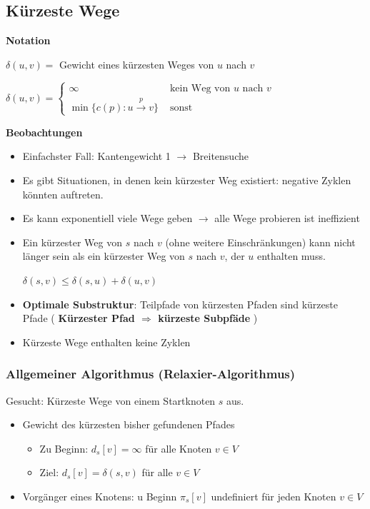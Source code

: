 \newpage

\begin{sectionbox}
\subsection{Kürzeste Wege}\smallskip
\textbf{Notation}\par\smallskip
$\delta(u, v)=$ Gewicht eines kürzesten Weges von $u$ nach $v$\par
$\delta(u, v)=\left\{\begin{array}{ll}
\infty & \text { kein Weg von } u \text { nach } v \\
\min \{c(p): u \stackrel{p}{\longrightarrow} v\} & \text { sonst }
\end{array}\right.$\par\smallskip

\textbf{Beobachtungen}\par
\begin{itemize}
    \item Einfachster Fall: Kantengewicht 1 $\rightarrow$ Breitensuche
    \item Es gibt Situationen, in denen kein kürzester Weg existiert: negative Zyklen könnten auftreten.
    \item Es kann exponentiell viele Wege geben $\rightarrow$  alle Wege probieren ist ineffizient
    \item Ein kürzester Weg von $s$ nach $v$ (ohne weitere Einschränkungen) kann nicht länger sein als ein kürzester Weg von $s$ nach $v$, der $u$ enthalten muss.\par
    \textcolor{tanne}{\textbf{$\delta(s, v) \leq \delta(s, u)+\delta(u, v)$}}
    \item \textbf{Optimale Substruktur}: Teilpfade von kürzesten Pfaden sind kürzeste Pfade ( \textbf{\textcolor{tanne}{Kürzester Pfad $\Rightarrow$ kürzeste Subpfäde}} )
    \item Kürzeste Wege enthalten keine Zyklen
\end{itemize}\par\vspace{10px}

\subsubsection{Allgemeiner Algorithmus (Relaxier-Algorithmus)}\smallskip
Gesucht: Kürzeste Wege von einem Startknoten $s$ aus.
\begin{itemize}
    \item Gewicht des kürzesten bisher gefundenen Pfades
    \begin{itemize}
        \item Zu Beginn: $d_{s}[v]=\infty$ für alle Knoten $v \in V$
        \item Ziel: $d_{s}[v]=\delta(s, v)$ für alle $v \in V$
    \end{itemize}
    \item Vorgänger eines Knotens: u Beginn $\pi_{s}[v]$ undefiniert für jeden Knoten $v \in V$
\end{itemize}\smallskip



\end{sectionbox}
